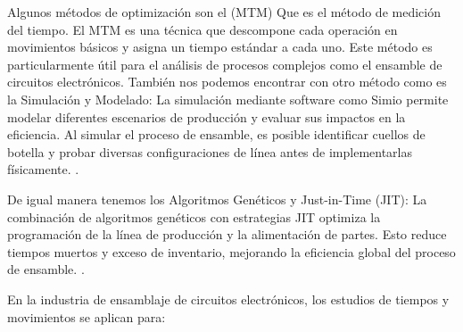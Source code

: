    Algunos métodos de optimización son el (MTM) Que es el método de medición del tiempo. El MTM es una técnica que descompone cada operación en movimientos básicos y asigna un tiempo estándar a cada uno. Este método es particularmente útil para el análisis de procesos complejos como el ensamble de circuitos electrónicos. 
    También nos podemos encontrar con otro método como es la  Simulación y Modelado: La simulación mediante software como Simio permite modelar diferentes escenarios de producción y evaluar sus impactos en la eficiencia. Al simular el proceso de ensamble, es posible identificar cuellos de botella y probar diversas configuraciones de línea antes de implementarlas físicamente. \cite{breznik2023assembly}.
    
    De igual manera tenemos los Algoritmos Genéticos y Just-in-Time (JIT): La combinación de algoritmos genéticos con estrategias JIT optimiza la programación de la línea de producción y la alimentación de partes. Esto reduce tiempos muertos y exceso de inventario, mejorando la eficiencia global del proceso de ensamble. \cite{zhang2021research}.
    
    En la industria de ensamblaje de circuitos electrónicos, los estudios de tiempos y movimientos se aplican para:
    
